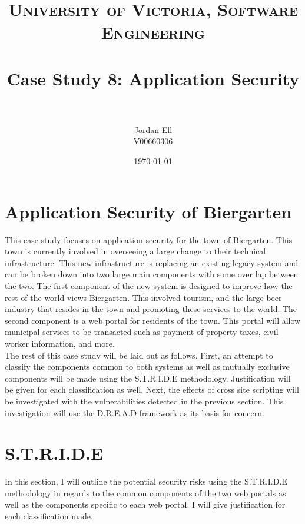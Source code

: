 \documentclass[paper=a4, fontsize=11pt]{scrartcl} %
\title{	
\normalfont \normalsize 
\textsc{University of Victoria, Software Engineering} \\ [25pt] %
\horrule{0.5pt} \\[0.4cm] %
\huge Case Study 8: Application Security \\ %
\horrule{2pt} \\[0.5cm] %
}
\author{Jordan Ell \\ V00660306} %
\date{\normalsize\today} %
\numberwithin{equation}{section} %
\numberwithin{figure}{section} %
\numberwithin{table}{section} %
\begin{document}
\maketitle %


\section{Application Security of Biergarten}

This case study focuses on application security for the town of Biergarten. This town is currently involved in overseeing
a large change to their technical infrastructure. This new infrastructure is replacing an existing legacy system and
can be broken down into two large main components with some over lap between the two. The first component of the new
system is designed to improve how the rest of the world views Biergarten. This involved tourism, and the large beer industry
that resides in the town and promoting these services to the world. The second component is a web portal for residents 
of the town. This portal will allow municipal services to be transacted such as payment of property taxes, civil
worker information, and more.\\

The rest of this case study will be laid out as follows. First, an attempt to classify the components common to both
systems as well as mutually exclusive components will be made using the S.T.R.I.D.E methodology. Justification will be
given for each classification as well. Next, the effects of cross site scripting will be investigated with the vulnerabilities
detected in the previous section. This investigation will use the D.R.E.A.D framework as its basis for concern.


\section{S.T.R.I.D.E}
In this section, I will outline the potential security risks using the S.T.R.I.D.E methodology in regards to the common
components of the two web portals as well as the components specific to each web portal. I will give justification
for each classification made.
\end{document}
